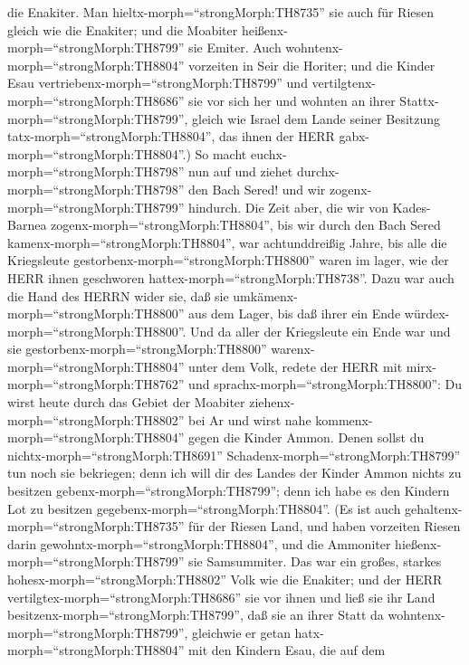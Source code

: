 die Enakiter.  Man hieltx-morph=``strongMorph:TH8735'' sie
auch für Riesen gleich wie die Enakiter; und die Moabiter
heißenx-morph=``strongMorph:TH8799'' sie Emiter.  Auch
wohntenx-morph=``strongMorph:TH8804'' vorzeiten in Seir die Horiter; und
die Kinder Esau vertriebenx-morph=``strongMorph:TH8799'' und
vertilgtenx-morph=``strongMorph:TH8686'' sie vor sich her und wohnten an
ihrer Stattx-morph=``strongMorph:TH8799'', gleich wie Israel dem Lande
seiner Besitzung tatx-morph=``strongMorph:TH8804'', das ihnen der HERR
gabx-morph=``strongMorph:TH8804''.)  So macht
euchx-morph=``strongMorph:TH8798'' nun auf und ziehet
durchx-morph=``strongMorph:TH8798'' den Bach Sered! und wir
zogenx-morph=``strongMorph:TH8799'' hindurch.  Die Zeit
aber, die wir von Kades-Barnea zogenx-morph=``strongMorph:TH8804'', bis
wir durch den Bach Sered kamenx-morph=``strongMorph:TH8804'', war
achtunddreißig Jahre, bis alle die Kriegsleute
gestorbenx-morph=``strongMorph:TH8800'' waren im lager, wie der HERR
ihnen geschworen hattex-morph=``strongMorph:TH8738''.  Dazu
war auch die Hand des HERRN wider sie, daß sie
umkämenx-morph=``strongMorph:TH8800'' aus dem Lager, bis daß ihrer ein
Ende würdex-morph=``strongMorph:TH8800''.  Und da aller der
Kriegsleute ein Ende war und sie gestorbenx-morph=``strongMorph:TH8800''
warenx-morph=``strongMorph:TH8804'' unter dem Volk,  redete
der HERR mit mirx-morph=``strongMorph:TH8762'' und
sprachx-morph=``strongMorph:TH8800'':  Du wirst heute durch
das Gebiet der Moabiter ziehenx-morph=``strongMorph:TH8802'' bei Ar
 und wirst nahe kommenx-morph=``strongMorph:TH8804'' gegen
die Kinder Ammon. Denen sollst du nichtx-morph=``strongMorph:TH8691''
Schadenx-morph=``strongMorph:TH8799'' tun noch sie bekriegen; denn ich
will dir des Landes der Kinder Ammon nichts zu besitzen
gebenx-morph=``strongMorph:TH8799''; denn ich habe es den Kindern Lot zu
besitzen gegebenx-morph=``strongMorph:TH8804''.  (Es ist
auch gehaltenx-morph=``strongMorph:TH8735'' für der Riesen Land, und
haben vorzeiten Riesen darin gewohntx-morph=``strongMorph:TH8804'', und
die Ammoniter hießenx-morph=``strongMorph:TH8799'' sie Samsummiter.
 Das war ein großes, starkes
hohesx-morph=``strongMorph:TH8802'' Volk wie die Enakiter; und der HERR
vertilgtex-morph=``strongMorph:TH8686'' sie vor ihnen und ließ sie ihr
Land besitzenx-morph=``strongMorph:TH8799'', daß sie an ihrer Statt da
wohntenx-morph=``strongMorph:TH8799'',  gleichwie er getan
hatx-morph=``strongMorph:TH8804'' mit den Kindern Esau, die auf dem
